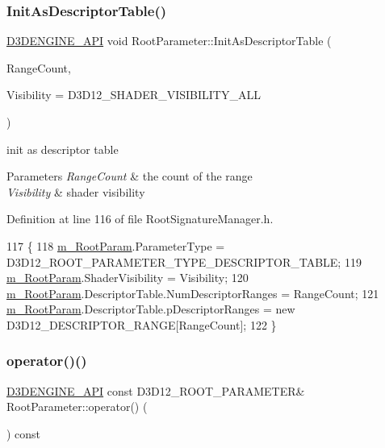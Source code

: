 \subsubsection{\texorpdfstring{Init\+As\+Descriptor\+Table()}{InitAsDescriptorTable()}}
{\footnotesize\ttfamily \mbox{\hyperlink{stdafx_8h_a8ee2d990c5dfba7794dd2b60741d7722}{D3\+D\+E\+N\+G\+I\+N\+E\+\_\+\+A\+PI}} void Root\+Parameter\+::\+Init\+As\+Descriptor\+Table (\begin{DoxyParamCaption}\item[{U\+I\+NT}]{Range\+Count,  }\item[{D3\+D12\+\_\+\+S\+H\+A\+D\+E\+R\+\_\+\+V\+I\+S\+I\+B\+I\+L\+I\+TY}]{Visibility = {\ttfamily D3D12\+\_\+SHADER\+\_\+VISIBILITY\+\_\+ALL} }\end{DoxyParamCaption})\hspace{0.3cm}{\ttfamily [inline]}}



init as descriptor table 


\begin{DoxyParams}{Parameters}
{\em Range\+Count} & the count of the range \\
\hline
{\em Visibility} & shader visibility \\
\hline
\end{DoxyParams}


Definition at line 116 of file Root\+Signature\+Manager.\+h.


\begin{DoxyCode}
117     \{
118         \mbox{\hyperlink{class_root_parameter_a66f26d4bb3cd092c625bc083c508fe40}{m\_RootParam}}.ParameterType = D3D12\_ROOT\_PARAMETER\_TYPE\_DESCRIPTOR\_TABLE;
119         \mbox{\hyperlink{class_root_parameter_a66f26d4bb3cd092c625bc083c508fe40}{m\_RootParam}}.ShaderVisibility = Visibility;
120         \mbox{\hyperlink{class_root_parameter_a66f26d4bb3cd092c625bc083c508fe40}{m\_RootParam}}.DescriptorTable.NumDescriptorRanges = RangeCount;
121         \mbox{\hyperlink{class_root_parameter_a66f26d4bb3cd092c625bc083c508fe40}{m\_RootParam}}.DescriptorTable.pDescriptorRanges = \textcolor{keyword}{new} D3D12\_DESCRIPTOR\_RANGE[RangeCount];
122     \}
\end{DoxyCode}
\mbox{\label{class_root_parameter_a8fbdf81ff58ae44320e6f3f43f4eac82}} 
\subsubsection{\texorpdfstring{operator()()}{operator()()}}
{\footnotesize\ttfamily \mbox{\hyperlink{stdafx_8h_a8ee2d990c5dfba7794dd2b60741d7722}{D3\+D\+E\+N\+G\+I\+N\+E\+\_\+\+A\+PI}} const D3\+D12\+\_\+\+R\+O\+O\+T\+\_\+\+P\+A\+R\+A\+M\+E\+T\+ER\& Root\+Parameter\+::operator() (\begin{DoxyParamCaption}\item[{void}]{ }\end{DoxyParamCaption}) const\hspace{0.3cm}{\ttfamily [inline]}}



